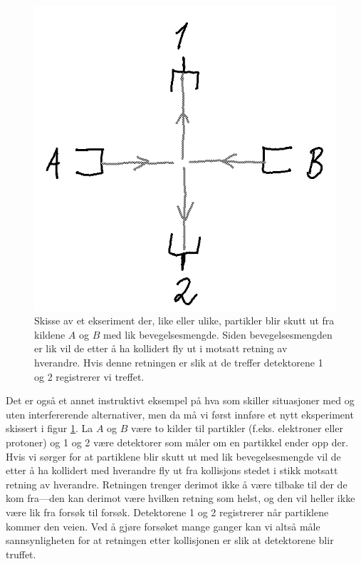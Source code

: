 \begin{figure}[tp]
\begin{center}
	\includegraphics{./spredningseksperiment}
\end{center}
\caption{Skisse av et ekseriment der, like eller ulike, partikler blir skutt ut fra kildene $A$ og $B$ med lik bevegelsesmengde. Siden bevegelsesmengden er lik vil de etter å ha kollidert fly ut i motsatt retning av hverandre. Hvis denne retningen er slik at de treffer detektorene 1 og 2 registrerer vi treffet.}
\label{fig:kvante:spredning}
\end{figure}

Det er også et annet instruktivt eksempel på hva som skiller situasjoner med og uten interfererende alternativer, men da må vi først innføre et nytt eksperiment skissert i figur \ref{fig:kvante:spredning}. La $A$ og $B$ være to kilder til partikler (f.eks. elektroner eller protoner) og 1 og 2 være detektorer som måler om en partikkel ender opp der. Hvis vi sørger for at partiklene blir skutt ut med lik bevegelsesmengde vil de etter å ha kollidert med hverandre fly ut fra kollisjons stedet i stikk motsatt retning av hverandre. Retningen trenger derimot ikke å være tilbake til der de kom fra---den kan derimot være hvilken retning som helst, og den vil heller ikke være lik fra forsøk til forsøk. Detektorene 1 og 2 registrerer når partiklene kommer den veien. Ved å gjøre forsøket mange ganger kan vi altså måle sannsynligheten for at retningen etter kollisjonen er slik at detektorene blir truffet.

